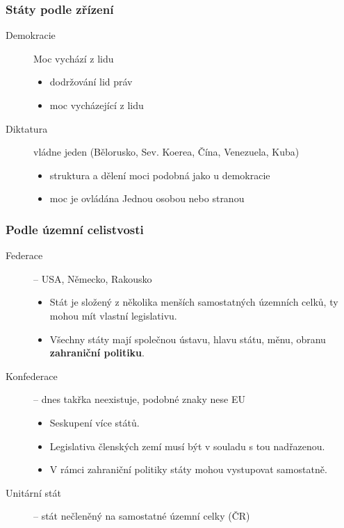 \documentclass[10pt,a4paper,
twoside,%
]{report}
\begin{document}
\subsubsection{Státy podle zřízení}
\begin{description}
\item[Demokracie]Moc vychází z lidu
	\begin{itemize}
	\item dodržování lid práv
	\item moc vycházející z lidu
	\end{itemize}

\item[Diktatura] vládne jeden (Bělorusko, Sev. Koerea, Čína, Venezuela, Kuba)
	\begin{itemize}
	\item struktura a dělení moci podobná jako u demokracie
	\item moc je ovládána Jednou osobou nebo stranou
	\end{itemize}
\end{description}

\subsubsection{Podle územní celistvosti}
\begin{description}
\item[Federace] -- USA, Německo, Rakousko
	\begin{itemize}
	\item Stát je složený z několika menších samostatných územních celků, ty mohou mít vlastní legislativu.
	\item Všechny státy mají společnou ústavu, hlavu státu, měnu, obranu \textbf{zahraniční politiku}.
	\end{itemize}

\item[Konfederace] -- dnes takřka neexistuje, podobné znaky nese EU
	\begin{itemize}
	\item Seskupení více států.
	\item Legislativa členských zemí musí být v souladu s tou nadřazenou.
	\item V rámci zahraniční politiky státy mohou vystupovat samostatně.
	\end{itemize}

\item[Unitární stát] -- stát nečleněný na samostatné územní celky (ČR)
\end{description}
\end{document}
